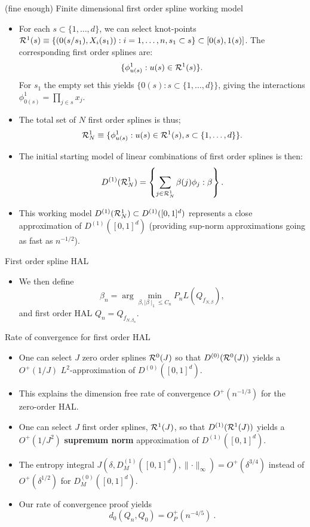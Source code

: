 \documentclass[t]{beamer}
\begin{document}
\begin{frame}{(fine enough) Finite dimensional first order spline working model}
\begin{itemize}
\item For each $s\subset\{1,\ldots,d\}$, we can select knot-points
${\cal R}^1(s)\equiv  \{(0(s/s_1),X_i(s_1)): i=1,\ldots,n,s_1\subset s\}\subset [0(s),1(s)]$. The corresponding first order splines are:
\[
\{\phi^1_{u(s)}: u(s)\in {\cal R}^1(s)\}.\]
For $s_1$ the empty set this yields  $\{0(s): s\subset\{1,\ldots,d\}\}$, giving the interactions $\phi^1_{0(s)}=\prod_{j\in s}x_j$.
\item The total set of $N$ first order splines is thus;
\[
{\cal R}^1_N\equiv \{\phi^1_{u(s)}: u(s)\in {\cal R}^1(s), s\subset \{1,\ldots,d\}\}.\]
\end{itemize}
\end{frame}

\begin{frame}
\begin{itemize}
\item The initial starting model of linear combinations of first order splines is then:
\[
D^{(1)}({\cal R}^1_N)=\left\{\sum_{j\in {\cal R}^1_N}\beta(j)\phi_j: \beta\right\}.\]
\item This working model $D^{(1)}({\cal R}^1_N)\subset D^{(1)}([0,1]^d)$ represents a close approximation of $D^{(1)}([0,1]^d)$ (providing sup-norm approximations going as fast as $n^{-1/2}$).
\end{itemize}
\end{frame}

\begin{frame}{First order spline HAL}
\begin{itemize}
\item We then define
\[
\beta_n=\arg\min_{\beta,\mid \beta\mid_1\leq C_n} P_n L(Q_{f_{N,\beta}}),\]
and first order HAL $Q_n=Q_{f_{N,\beta_n}}$.
\end{itemize}
\end{frame}

\begin{frame}{Rate of convergence for first order HAL}
\begin{itemize}
\item One can select $J$ zero order splines ${\cal R}^0(J)$ so that  $D^{(0)}({\cal R}^0(J))$ yields a $O^+(1/J)$ $L^2$-approximation of
$D^{(0)}([0,1]^d)$.
\item This explains the dimension free rate of convergence $O^+(n^{-1/3})$ for the zero-order HAL.
\item One can select $J$ first order splines, ${\cal R}^1(J)$, so that $D^{(1)}({\cal R}^1(J))$ yields a $O^+(1/J^2)$ {\bf supremum norm} approximation of $D^{(1)}([0,1]^d)$.
\item The entropy integral $J(\delta, D^{(1)}_M([0,1]^d),\lVert \cdot \rVert_{\infty})=O^+( \delta^{3/4})$ instead of $O^+(\delta^{1/2})$ for $D^{(0)}_M([0,1]^d)$.
\item Our rate of convergence proof  yields
\[
  d_0(Q_n,Q_0)=O_P^+(n^{-4/5}) \ .
\]
\end{itemize}
\end{frame}
\end{document}
